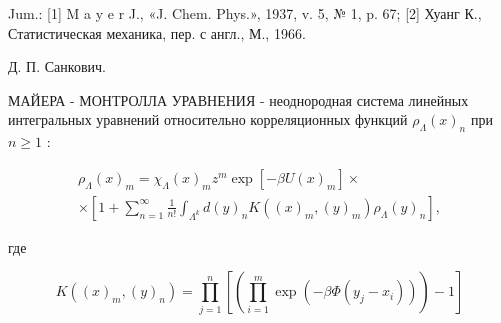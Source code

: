 \documentclass[10pt]{article}
\begin{document}
Jum.: [1] M a y e r J., «J. Chem. Phys.», 1937, v. 5, № 1, p. 67; [2] Хуанг К., Статистическая механика, пер. с англ., М., 1966.



Д. П. Санкович.



МАЙЕРА - МОНТРОЛЛА УРАВНЕНИЯ - неоднородная система линейных интегральных уравнений относительно корреляционных функций $\rho_{\Lambda}(x)_{n}$ при $n \geqslant 1$ :



\[

\begin{gathered}

\rho_{\Lambda}(x)_{m}=\chi_{\Lambda}(x)_{m} z^{m} \exp \left[-\beta U(x)_{m}\right] \times \\

\times\left[1+\sum_{n=1}^{\infty} \frac{1}{n !} \int_{\Lambda^{k}} d(y)_{n} K\left((x)_{m},(y)_{m}\right) \rho_{\Lambda}(y)_{n}\right],

\end{gathered}

\]



где



\[

K\left((x)_{m},(y)_{n}\right)=\prod_{j=1}^{n}\left[\left(\prod_{i=1}^{m} \exp \left(-\beta \Phi\left(y_{j}-x_{i}\right)\right)\right)-1\right]

\]
\end{document}
